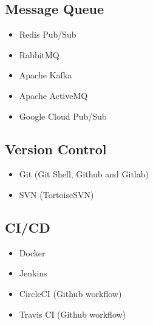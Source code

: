 \begin{cventries}
\begin{row}[cellsep=0.75cm]{3}{3}
    \begin{cell}{1}
	\section*{Message Queue}
	\vspace{-1.5ex}
    \begin{itemize}
        \item {Redis Pub/Sub}
        \item {RabbitMQ}
        \item {Apache Kafka}
        \item {Apache ActiveMQ}
        \item {Google Cloud Pub/Sub}
    \end{itemize}
	\end{cell}
    \begin{cell}{1}
	\section*{Version Control}
	\vspace{-1.5ex}
    \begin{itemize}
        \item {Git (Git Shell, Github and Gitlab)}
        \item {SVN (TortoiseSVN)}
    \end{itemize}
	\end{cell}
	\begin{cell}{1}
	\section*{CI/CD}
	\vspace{-1.5ex}
    \begin{itemize}
        \item {Docker}
        \item {Jenkins}
        \item {CircleCI (Github workflow)}
        \item {Travis CI (Github workflow)}
    \end{itemize}
	\end{cell}
\end{row}

\begin{row}[cellsep=0.75cm]{3}{3}
    \begin{cell}{1}

\end{cell}
\end{row}
\end{cventries}
